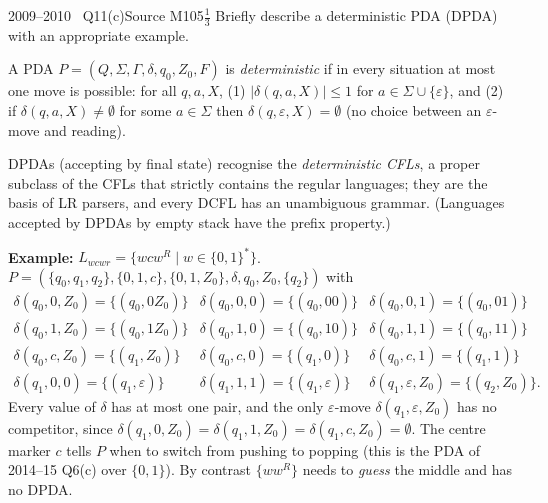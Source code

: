 \documentclass[11pt,a4paper]{article}
\newcommand{\eps}{\varepsilon}
\begin{document}
\begin{question}{2009--2010 \textbullet\ Q11(c)}{Source M10}{5$\tfrac13$}
Briefly describe a deterministic PDA (DPDA) with an appropriate example.
\end{question}
\begin{solution}
A PDA $P=(Q,\Sigma,\Gamma,\delta,q_0,Z_0,F)$ is \emph{deterministic} if in every situation at most one move is possible: for all $q,a,X$, (1) $|\delta(q,a,X)|\le1$ for $a\in\Sigma\cup\{\eps\}$, and (2) if $\delta(q,a,X)\neq\emptyset$ for some $a\in\Sigma$ then $\delta(q,\eps,X)=\emptyset$ (no choice between an $\eps$-move and reading).

DPDAs (accepting by final state) recognise the \emph{deterministic CFLs}, a proper subclass of the CFLs that strictly contains the regular languages; they are the basis of LR parsers, and every DCFL has an unambiguous grammar. (Languages accepted by DPDAs by empty stack have the prefix property.)

\textbf{Example:} $L_{wcwr}=\{wcw^R\mid w\in\{0,1\}^*\}$. $P=(\{q_0,q_1,q_2\},\{0,1,c\},\{0,1,Z_0\},\delta,q_0,Z_0,\{q_2\})$ with
\[\begin{array}{lll}
\delta(q_0,0,Z_0)=\{(q_0,0Z_0)\} & \delta(q_0,0,0)=\{(q_0,00)\} & \delta(q_0,0,1)=\{(q_0,01)\}\\
\delta(q_0,1,Z_0)=\{(q_0,1Z_0)\} & \delta(q_0,1,0)=\{(q_0,10)\} & \delta(q_0,1,1)=\{(q_0,11)\}\\
\delta(q_0,c,Z_0)=\{(q_1,Z_0)\} & \delta(q_0,c,0)=\{(q_1,0)\} & \delta(q_0,c,1)=\{(q_1,1)\}\\
\delta(q_1,0,0)=\{(q_1,\eps)\} & \delta(q_1,1,1)=\{(q_1,\eps)\} & \delta(q_1,\eps,Z_0)=\{(q_2,Z_0)\}.
\end{array}\]
Every value of $\delta$ has at most one pair, and the only $\eps$-move $\delta(q_1,\eps,Z_0)$ has no competitor, since $\delta(q_1,0,Z_0)=\delta(q_1,1,Z_0)=\delta(q_1,c,Z_0)=\emptyset$. The centre marker $c$ tells $P$ when to switch from pushing to popping (this is the PDA of 2014--15 Q6(c) over $\{0,1\}$). By contrast $\{ww^R\}$ needs to \emph{guess} the middle and has no DPDA.
\end{solution}
\end{document}
